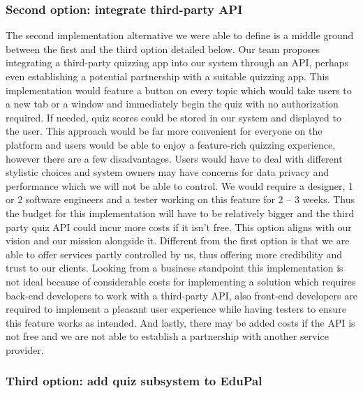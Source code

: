 \documentclass[
    english, %
]{VUMIFPSkursinis}
\begin{document}
\subsubsection{Second option: integrate third-party API}

The second implementation alternative we were able to define is a middle ground between the first and the third option detailed below. Our team proposes integrating a third-party quizzing app into our system through an API, perhaps even establishing a potential partnership with a suitable quizzing app. This implementation would feature a button on every topic which would take users to a new tab or a window and immediately begin the quiz with no authorization required. If needed, quiz scores could be stored in our system and displayed to the user. This approach would be far more convenient for everyone on the platform and users would be able to enjoy a feature-rich quizzing experience, however there are a few disadvantages. Users would have to deal with different stylistic choices and system owners may have concerns for data privacy and performance which we will not be able to control. We would require a designer, 1 or 2 software engineers and a tester working on this feature for 2 – 3 weeks. Thus the budget for this implementation will have to be relatively bigger and the third party quiz API could incur more costs if it isn’t free. This option aligns with our vision and our mission alongside it. Different from the first option is that we are able to offer services partly controlled by us, thus offering more credibility and trust to our clients. Looking from a business standpoint this implementation is not ideal because of considerable costs for implementing a solution which requires back-end developers to work with a third-party API, also front-end developers are required to implement a pleasant user experience while having testers to ensure this feature works as intended. And lastly, there may be added costs if the API is not free and we are not able to establish a partnership with another service provider.

\subsubsection{Third option: add quiz subsystem to EduPal}
\end{document}
